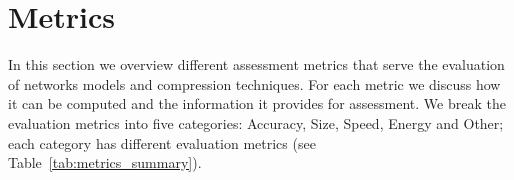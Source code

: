 %
















\section{Metrics}\label{sec:metrics}
In this section we overview different assessment metrics that serve the evaluation of networks models and compression techniques. For each metric we discuss how it can be computed and the information it provides for assessment. We break the evaluation metrics into five categories: Accuracy, Size, Speed, Energy and Other; each category has different evaluation metrics (see Table~\ref{tab:metrics_summary}).

